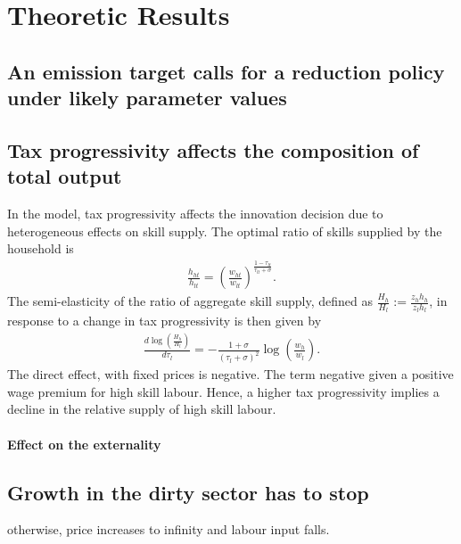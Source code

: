 \section{Theoretic Results}
\subsection{An emission target calls for a reduction policy under likely parameter values}
\subsection{Tax progressivity affects the composition of total output}
In the model, tax progressivity affects the innovation decision due to heterogeneous effects on skill supply. 
The optimal ratio of skills supplied by the household is
\begin{align}
\frac{h_{ht}}{h_{lt}}=\left(\frac{w_{ht}}{w_{lt}}\right)^\frac{1-\tau_{lt}}{\tau_{lt}+\sigma}.
\end{align}
The semi-elasticity of the ratio of aggregate skill supply, defined as $\frac{H_h}{H_l}:=\frac{z_hh_h}{z_lh_l}$, in response to a change in tax progressivity is then given by
\begin{align}
\frac{d\log\left(\frac{H_h}{H_l}\right)}{d\tau_l}=-\frac{1+\sigma}{(\tau_l+\sigma)^2}\log\left(\frac{w_{h}}{w_l}\right). \end{align}
The direct effect, with fixed prices is negative. 
The term negative given a positive wage premium for high skill labour. Hence, a higher tax progressivity implies a decline in the relative supply of high skill labour. 

\paragraph{Effect on the externality }

\subsection{Growth in the dirty sector has to stop}
otherwise, price increases to infinity and labour input falls.